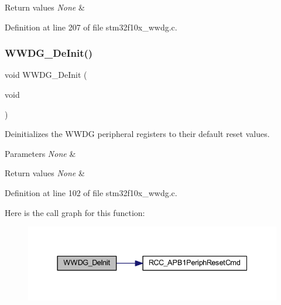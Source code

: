 \begin{DoxyRetVals}{Return values}
{\em None} & \\
\hline
\end{DoxyRetVals}


Definition at line 207 of file stm32f10x\+\_\+wwdg.\+c.

\mbox{\label{group___w_w_d_g___private___functions_ga7130f4dc861b9234b62e73f9f57f89a1}} 
\subsubsection{\texorpdfstring{W\+W\+D\+G\+\_\+\+De\+Init()}{WWDG\_DeInit()}}
{\footnotesize\ttfamily void W\+W\+D\+G\+\_\+\+De\+Init (\begin{DoxyParamCaption}\item[{void}]{ }\end{DoxyParamCaption})}



Deinitializes the W\+W\+DG peripheral registers to their default reset values. 


\begin{DoxyParams}{Parameters}
{\em None} & \\
\hline
\end{DoxyParams}

\begin{DoxyRetVals}{Return values}
{\em None} & \\
\hline
\end{DoxyRetVals}


Definition at line 102 of file stm32f10x\+\_\+wwdg.\+c.

Here is the call graph for this function\+:
\nopagebreak
\begin{figure}[H]
\begin{center}
\leavevmode
\includegraphics[width=337pt]{group___w_w_d_g___private___functions_ga7130f4dc861b9234b62e73f9f57f89a1_cgraph}
\end{center}
\end{figure}
\mbox{\label{group___w_w_d_g___private___functions_ga10dc2554d0b504b5472e3ecf0f02a9e6}} 
